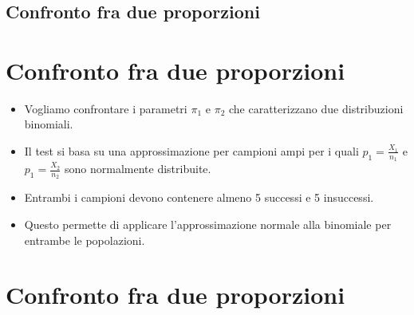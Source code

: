 \documentclass[
]{article}
\author{}
\date{\vspace{-2.5em}}
\providecommand{\tightlist}{%
  \setlength{\itemsep}{0pt}\setlength{\parskip}{0pt}}
\begin{document}
\hypertarget{section}{%
\section{}\label{section}}

\hypertarget{confronto-fra-due-proporzioni}{%
\subsection{Confronto fra due
proporzioni}\label{confronto-fra-due-proporzioni}}

\hypertarget{confronto-fra-due-proporzioni-1}{%
\section{Confronto fra due
proporzioni}\label{confronto-fra-due-proporzioni-1}}

\begin{itemize}
\tightlist
\item
  Vogliamo confrontare i parametri \(\pi_1\) e \(\pi_2\) che
  caratterizzano due distribuzioni binomiali.
\end{itemize}

\bigskip

\begin{itemize}
\tightlist
\item
  Il test si basa su una approssimazione per campioni ampi per i quali
  \(p_1 = \frac{X_1}{n_1}\) e \(p_1 = \frac{X_2}{n_2}\) sono normalmente
  distribuite.
\end{itemize}

\bigskip

\begin{itemize}
\tightlist
\item
  Entrambi i campioni devono contenere almeno 5 successi e 5 insuccessi.
\end{itemize}

\bigskip

\begin{itemize}
\tightlist
\item
  Questo permette di applicare l'approssimazione normale alla binomiale
  per entrambe le popolazioni.
\end{itemize}

\hypertarget{confronto-fra-due-proporzioni-2}{%
\section{Confronto fra due
proporzioni}\label{confronto-fra-due-proporzioni-2}}
\end{document}
